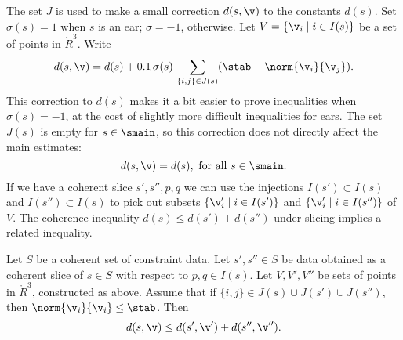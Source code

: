 The set $J$ is used to make a small correction $d(s,\v)$ to the
constants $d(s)$.  Set $\sigma(s) =1$ when $s$ is an ear;  $\sigma =
-1$, otherwise.  Let $V=\{\v_i\mid i\in I(s)\}$ 
be a set of points in $\ring{R}^3$.
Write
\begin{equation}
d(s,\v) = d(s) +  0.1\, \sigma(s)\,\sum_{\{i,j\}\in J(s)} (\stab - \norm{\v_i}{\v_j}).
\end{equation}
%
This correction to $d(s)$  makes it a bit easier to prove inequalities when
$\sigma(s)=-1$, at the cost of slightly more difficult inequalities for ears.
The set $J(s)$ is empty for $s\in \smain$, so this correction does not
directly affect the main estimates:
\[
d(s,\v) = d(s), \text{ for all } s \in \smain.
\]
If we have a coherent slice $s',s'',p,q$ we can use the injections 
$I(s')\subset I(s)$ and $I(s'')\subset I(s)$
 to pick out  subsets
$\{\v'_i\mid i\in I(s')\}$
and $\{\v'_i\mid i\in I(s'')\}$ of $V$.
The coherence inequality $d(s)\le d(s') + d(s'')$ under slicing
implies a related inequality.

\begin{lemma}
Let $S$ be a coherent set of constraint data.  Let $s',s''\in S$ be data
obtained as a coherent slice of $s\in S$ with respect to $p,q\in I(s)$.
Let $V,V',V''$ be sets of points in $\ring{R}^3$, constructed as above.
Assume that if $\{i,j\}\in J(s)\cup J(s')\cup J(s'')$, 
then $\norm{\v_i}{\v_i}\le \stab$.
Then
\begin{equation}
d(s,\v) \le d(s',\v') + d(s'',\v'').
\end{equation}
\end{lemma}

